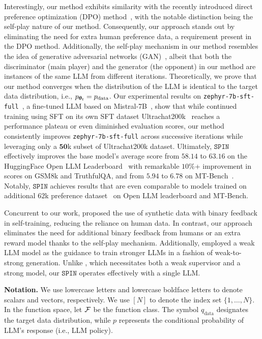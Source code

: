 \documentclass{article}
\newcommand{\method}{\texttt{SPIN}}
\begin{document}
Interestingly, our method exhibits similarity with the recently introduced direct preference optimization (DPO) method~\citep{rafailov2023direct},  with the notable distinction being the self-play nature of our method. Consequently, our approach stands out by eliminating the need for extra human preference data, a requirement present in the DPO method.
Additionally, the self-play mechanism in our method resembles the idea of generative adversarial networks (GAN)~\citep{goodfellow2014generative,arjovsky2017wasserstein}, albeit that both the discriminator (main player) and the generator (the opponent) in our method are instances of the same LLM  from different iterations. Theoretically, we prove that our method converges when the distribution of the LLM is identical to the target data distribution, i.e., $p_{\bm{\theta}_t} = p_{\mathrm{data}}$.
Our experimental results on \texttt{zephyr-7b-sft-full}~\citep{tunstall2023zephyr}, a fine-tuned LLM based on Mistral-7B~\citep{jiang2023mistral}, show that while continued training using SFT on its own SFT dataset Ultrachat200k~\citep{ding2023enhancing} reaches a performance plateau or even diminished evaluation scores, our method consistently improves \texttt{zephyr-7b-sft-full} across successive iterations while leveraging only a $\mathbf{50}$k subset of  Ultrachat200k dataset.  
Ultimately, $\method$ effectively improves the base model's average score from $58.14$ to $\mathbf{63.16}$ on the HuggingFace Open LLM Leaderboard~\citep{open-llm-leaderboard} with remarkable $10\%$+ improvement in scores on GSM8k and TruthfulQA, and from $5.94$ to $\mathbf{6.78}$ on MT-Bench~\citep{zheng2023judging}.
Notably, $\method$ achieves results that are even comparable to models trained on additional $62$k preference dataset~\citep{tunstall2023zephyr} on Open LLM leaderboard and MT-Bench. 



Concurrent to our work, \citet{singh2023beyond} proposed the use of synthetic data with binary feedback in self-training, reducing the reliance on human data. In contrast, our approach eliminates the need for additional binary feedback from humans or an extra reward model thanks to the self-play mechanism. 
Additionally, \citet{burnsweak} employed a weak LLM model as the guidance to train stronger LLMs in a fashion of weak-to-strong generation. Unlike \citet{burnsweak}, which necessitates both a weak supervisor and a strong model, our $\method$ operates effectively with a single LLM. 


\noindent\textbf{Notation.} We use lowercase letters and lowercase boldface letters to denote scalars and vectors, respectively. We use $[N]$ to denote the index set $\{1, \dots, N\}$. In the function space, let $\mathcal{F}$ be the function class. The symbol $q_{\mathrm{data}}$ designates the target data distribution, while $p$ represents the conditional probability of LLM's response (i.e., LLM policy).
\end{document}
